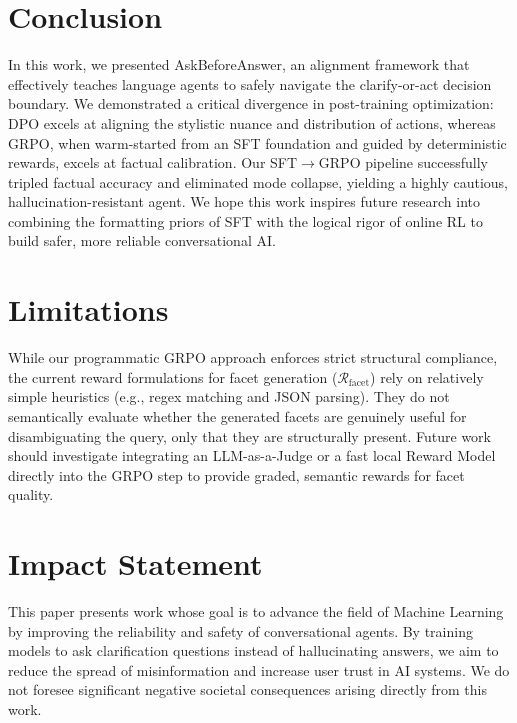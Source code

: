 \documentclass{article}
\theoremstyle{plain}
\theoremstyle{definition}
\theoremstyle{remark}
\begin{document}
\section{Conclusion}
In this work, we presented AskBeforeAnswer, an alignment framework that effectively teaches language agents to safely navigate the clarify-or-act decision boundary. We demonstrated a critical divergence in post-training optimization: DPO excels at aligning the stylistic nuance and distribution of actions, whereas GRPO, when warm-started from an SFT foundation and guided by deterministic rewards, excels at factual calibration. Our SFT$\rightarrow$GRPO pipeline successfully tripled factual accuracy and eliminated mode collapse, yielding a highly cautious, hallucination-resistant agent. We hope this work inspires future research into combining the formatting priors of SFT with the logical rigor of online RL to build safer, more reliable conversational AI.

\section{Limitations}
While our programmatic GRPO approach enforces strict structural compliance, the current reward formulations for facet generation ($\mathcal{R}_{\text{facet}}$) rely on relatively simple heuristics (e.g., regex matching and JSON parsing). They do not semantically evaluate whether the generated facets are genuinely useful for disambiguating the query, only that they are structurally present. Future work should investigate integrating an LLM-as-a-Judge or a fast local Reward Model directly into the GRPO step to provide graded, semantic rewards for facet quality.

\section*{Impact Statement}
This paper presents work whose goal is to advance the field of Machine Learning by improving the reliability and safety of conversational agents. By training models to ask clarification questions instead of hallucinating answers, we aim to reduce the spread of misinformation and increase user trust in AI systems. We do not foresee significant negative societal consequences arising directly from this work.

\nocite{langley00}
\end{document}
